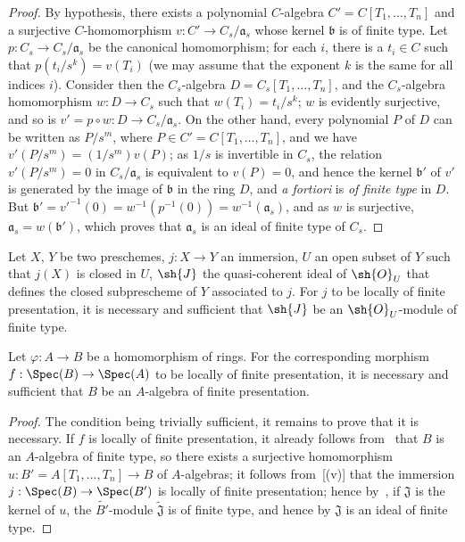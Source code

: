\begin{proof}
By hypothesis, there exists a polynomial $C$-algebra $C'=C[T_1,\ldots,T_n]$ and a surjective $C$-homomorphism $v:C'\to C_s/\mathfrak{a}_s$ whose kernel $\mathfrak{b}$ is of finite type.
Let $p:C_s\to C_s/\mathfrak{a}_s$ be the canonical homomorphism; for each $i$, there is a $t_i\in C$ such that $p(t_i/s^k)=v(T_i)$ (we may assume that the exponent $k$ is the same for all indices $i$).
Consider then the $C_s$-algebra $D=C_s[T_1,\ldots,T_n]$, and the $C_s$-algebra homomorphism $w:D\to C_s$ such that $w(T_i)=t_i/s^k$; $w$ is evidently surjective, and so is $v'=p\circ w:D\to C_s/\mathfrak{a}_s$.
On the other hand, every polynomial $P$ of $D$ can be written as $P/s^m$, where $P\in C'=C[T_1,\ldots,T_n]$, and we have $v'(P/s^m)=(1/s^m)v(P)$; as $1/s$ is invertible in $C_s$, the relation $v'(P/s^m)=0$ in $C_s/\mathfrak{a}_s$ is equivalent to $v(P)=0$, and hence the kernel $\mathfrak{b}'$ of $v'$ is generated by the image of $\mathfrak{b}$ in the ring $D$, and \emph{a fortiori} is \emph{of finite type} in $D$.
But $\mathfrak{b}'=v'^{-1}(0)=w^{-1}(p^{-1}(0))=w^{-1}(\mathfrak{a}_s)$, and as $w$ is surjective, $\mathfrak{a}_s=w(\mathfrak{b}')$, which proves that $\mathfrak{a}_s$ is an ideal of finite type of $C_s$.
\end{proof}

\begin{corollary}[1.4.5]
\label{IV.1.4.5}
Let $X$, $Y$ be two preschemes, $j:X\to Y$ an immersion, $U$ an open subset of $Y$ such that $j(X)$ is closed in $U$, $\sh{J}$ the quasi-coherent ideal of $\sh{O}_U$ that defines the closed subprescheme of $Y$ associated to $j$.
For $j$ to be locally of finite presentation, it is necessary and sufficient that $\sh{J}$ be an $\sh{O}_U$-module of finite type.
\end{corollary}

\begin{proposition}[1.4.6]
\label{IV.1.4.6}
Let $\varphi:A\to B$ be a homomorphism of rings.
For the corresponding morphism $f:\Spec(B)\to\Spec(A)$ to be locally of finite presentation, it is necessary and sufficient that $B$ be an $A$-algebra of finite presentation.
\end{proposition}

\begin{proof}
The condition being trivially sufficient, it remains to prove that it is necessary.
If $f$ is locally of finite presentation, it already follows from~ that $B$ is an $A$-algebra
of finite type, so there exists a surjective homomorphism $u:B'=A[T_1,\ldots,T_n]\to B$ of $A$-algebras; it follows from~[(v)] that the immersion $j:\Spec(B)\to\Spec(B')$ is locally of finite presentation; hence by~, if $\mathfrak{J}$ is the kernel of $u$, the $\widetilde{B'}$-module $\widetilde{\mathfrak{J}}$ is of finite type, and hence by  $\mathfrak{J}$ is an ideal of finite type.
\end{proof}

